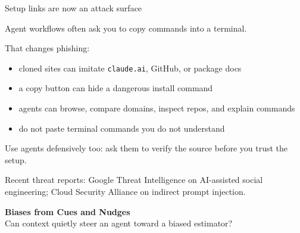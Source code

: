 \documentclass[aspectratio=169,11pt]{beamer}
\begin{document}
\begin{frame}{Setup links are now an attack surface}

Agent workflows often ask you to copy commands into a terminal.

\vspace{0.25cm}

That changes phishing:

\vspace{0.15cm}

\begin{itemize}\setlength\itemsep{0.3em}
    \item cloned sites can imitate \texttt{claude.ai}, GitHub, or package docs
    \item a copy button can hide a dangerous install command
    \item agents can browse, compare domains, inspect repos, and explain commands
    \item do not paste terminal commands you do not understand
\end{itemize}

\vspace{0.25cm}

\alert{Use agents defensively too: ask them to verify the source before you trust the setup.}

\vspace{0.15cm}
{\scriptsize\color{warmgray} Recent threat reports: Google Threat Intelligence on AI-assisted social engineering; Cloud Security Alliance on indirect prompt injection.}

\end{frame}


\begin{frame}[plain]
\vfill
\begin{center}
{\LARGE\bfseries\textcolor{charcoal}{Biases from Cues and Nudges}}\\[0.35cm]
{\large\textcolor{warmgray}{Can context quietly steer an agent toward a biased estimator?}}
\end{center}
\vfill
\end{frame}
\end{document}

